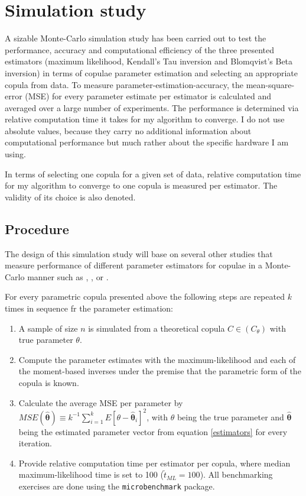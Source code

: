 
\chapter{Simulation study} 

\label{simulation-study}

A sizable Monte-Carlo simulation study has been carried out to test the performance, accuracy and computational efficiency of the three presented estimators (maximum likelihood, Kendall's Tau inversion and Blomqvist's Beta inversion) in terms of copulae parameter estimation and selecting an appropriate copula from data. To measure parameter-estimation-accuracy, the mean-square-error (MSE) for every parameter estimate per estimator is calculated and averaged over a large number of experiments. The performance is determined via relative computation time it takes for my algorithm to converge. I do not use absolute values, because they carry no additional information about computational performance but much rather about the specific hardware I am using.

In terms of selecting one copula for a given set of data, relative computation time for my algorithm to converge to one copula is measured per estimator. The validity of its choice is also denoted.

\section{Procedure}

The design of this simulation study will base on several other studies that measure performance of different parameter estimators for copulae in a Monte-Carlo manner such as \citet{kim2007comparison}, \citet{kojadinovic2010comparison}, \citet{weiss2011copula} or \citet{genest2013copula}.

For every parametric copula presented above the following steps are repeated $k$ times in sequence fr the parameter estimation:

\begin{enumerate}
	\itemsep0em
	\item A sample of size $n$ is simulated from a theoretical copula $C \in (C_\theta)$ with true parameter $\theta$.
	\item Compute the parameter estimates with the maximum-likelihood and each of the moment-based inverses under the premise that the parametric form of the copula is known.
	\item Calculate the average MSE per parameter by $MSE(\hat{\boldsymbol{\theta}}) \equiv k^{-1}   \sum_{i=1}^{k} E\left[ \theta - \hat{\boldsymbol{\theta}}_i \right]^2 $, with $\theta$ being the true parameter and $\hat{\boldsymbol{\theta}}$ being the estimated parameter vector from equation \ref{estimators} for every iteration.
	\item Provide relative computation time per estimator per copula, where median maximum-likelihood time is set to 100 ($\tilde{t}_{ML} = 100$). All benchmarking exercises are done using the \verb*|microbenchmark| package.
\end{enumerate}

